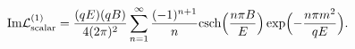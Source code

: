 \begin{equation}
{\rm Im} {\cal L}^{(1)}_{\rm scalar} = \frac{(qE)(qB)}{4 (2 \pi)^2} 
\sum_{n = 1}^{\infty} \frac{(-1)^{n+1}}{n} 
{\rm csch} \Bigl( \frac{n \pi B}{E} \Bigr) 
\exp \Bigl(- \frac{n \pi m^2}{qE} \Bigr). \label{form1}
\end{equation}

